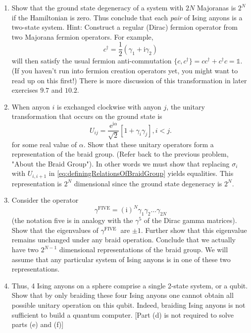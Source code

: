 \documentclass{book}
\begin{document}
\begin{enumerate}
\item Show that the ground state degeneracy of a system with $2N$ Majoranas is $2^{N}$ if the Hamiltonian is zero. Thus conclude that each \textit{pair} of Ising anyons is a two-state system. Hint: Construct a regular (Dirac) fermion operator from two Majorana fermion operators. For example,\begin{equation*}
c^{\dagger } =\frac{1}{2}( \gamma _{1} +\mathrm{i} \gamma _{2})
\end{equation*}will then satisfy the usual fermion anti-commutation $\{c,c^{\dagger } \}=cc^{\dagger } +c^{\dagger } c=\mathds{1}$. (If you haven't run into fermion creation operators yet, you might want to read up on this first!) There is more discussion of this transformation in later exercises $9.7$ and $10.2$.
\item When anyon $i$ is exchanged clockwise with anyon $j$, the unitary transformation that occurs on the ground state is\begin{equation}
U_{ij} =\frac{\mathrm{e}^{\mathrm{i} \alpha }}{\sqrt{2}}[ 1+\gamma _{i} \gamma _{j}] ,i< j.
\label{eq:representationOfBraidGroup}
\end{equation}for some real value of $\alpha $. Show that these unitary operators form a representation of the braid group. (Refer back to the previous problem, "About the Braid Group"). In other words we must show that replacing $\sigma _{i}$ with $U_{i,i+1}$ in \eqref{eq:definingRelationsOfBraidGroup} yields equalities. This representation is $2^{N}$ dimensional since the ground state degeneracy is $2^{N}$.
\item Consider the operator\begin{equation*}
\gamma ^{\mathrm{FIVE}} =(\mathrm{i} )^{N} \gamma _{1} \gamma _{2} \dotsc \gamma _{2N}
\end{equation*}(the notation five is in analogy with the $\gamma ^{5}$ of the Dirac gamma matrices). Show that the eigenvalues of $\gamma ^{\text{FIVE }}$ are $\pm 1$. Further show that this eigenvalue remains unchanged under any braid operation. Conclude that we actually have two $2^{N-1}$ dimensional representations of the braid group. We will assume that any particular system of Ising anyons is in one of these two representations.
\item Thus, 4 Ising anyons on a sphere comprise a single 2-state system, or a qubit. Show that by only braiding these four Ising anyons one cannot obtain all possible unitary operation on this qubit. Indeed, braiding Ising anyons is not sufficient to build a quantum computer. [Part (d) is not required to solve parts (e) and (f)]

\end{enumerate}
\end{document}
